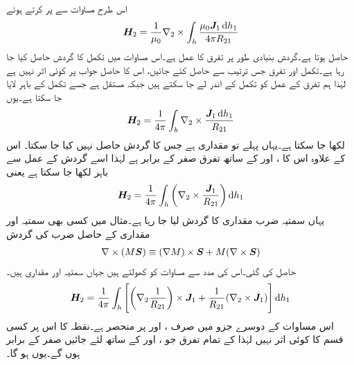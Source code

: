 اس طرح مساوات  سے  پر کرتے ہوئے
\begin{align*}
\kvec{H}_2=\frac{1}{\mu_0} \nabla_2 \times \int_h \frac{\mu_0 \kvec{J}_1 \dif h_1}{4\pi R_{21}}
\end{align*}
حاصل ہوتا ہے۔گردش  بنیادی طور پر تفرق کا عمل ہے۔اس مساوات میں تکمل کا گردش حاصل کیا جا رہا ہے۔تکمل اور تفرق جس ترتیب سے حاصل کئے جائیں، اس کا حاصل جواب پر کوئی اثر نہیں ہے لہٰذا ہم تفرق کے عمل کو تکمل کے اندر لے جا سکتے ہیں جبکہ  مستقل ہے جسے تکمل کے باہر لایا جا سکتا ہے۔یوں
\begin{align*}
\kvec{H}_2=\frac{1}{4\pi}  \int_h \nabla_2 \times\frac{ \kvec{J}_1 \dif h_1}{ R_{21}}
\end{align*}
لکھا جا سکتا ہے۔یہاں  پہلے تو مقداری ہے جس کا گردش حاصل نہیں کیا جا سکتا۔ اس کے علاوہ اس کا ،  اور  کے ساتھ تفرق صفر کے برابر ہے لہٰذا اسے گردش کے عمل سے  باہر لکھا جا سکتا ہے یعنی
\begin{align}\label{مساوات_مقناطیسی_گردش_ثبوت_الف}
\kvec{H}_2=\frac{1}{4\pi}  \int_h \left(\nabla_2 \times\frac{ \kvec{J}_1}{ R_{21}}\right) \dif h_1
\end{align}
یہاں سمتیہ  ضرب مقداری  کا گردش لیا جا رہا ہے۔مثال  میں کسی بھی سمتیہ  اور مقداری  کے حاصل ضرب کی گردش
\begin{align}
\nabla \times (M {{\boldsymbol{S}}}) \equiv (\nabla M) \times {\ensuremath{{\boldsymbol{S}}}} +M(\nabla \times {\ensuremath{{\boldsymbol{S}}}})
\end{align}
حاصل کی گئی۔اس کی مدد سے مساوات  کو کھولتے ہیں جہاں سمتیہ  اور مقداری  ہیں۔
\begin{align}\label{مساوات_مقناطیسی_گردش_ثبوت_ب}
\kvec{H}_2=\frac{1}{4\pi}  \int_h  \left[ \left(\nabla_2 \frac{1}{R_{21}}\right) \times \kvec{J}_1 +\frac{1}{R_{21}} (\nabla_2 \times \kvec{J}_1) \right]\dif h_1
\end{align}
اس مساوات کے دوسرے جزو میں  صرف ،  اور  پر منحصر ہے۔نقطہ  کا اس پر کسی قسم  کا کوئی اثر نہیں لہٰذا  کے تمام تفرق جو ،  اور  کے ساتھ لئے جائیں صفر کے برابر ہوں گے۔یوں  ہو گا۔


